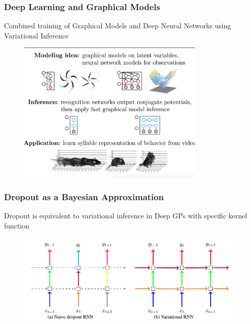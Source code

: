 \documentclass[11pt,
               hyperref={colorlinks,citecolor=pink,linkcolor=red,urlcolor=blue}
               ]{beamer}
\begin{document}
  \begin{frame}
    \frametitle{Deep Learning and Graphical Models}

    \centering Combined training of Graphical Models and Deep Neural Networks using Variational Inference\footnotemark[1]

    \begin{figure}
      \centering
      \includegraphics[width=0.8\textwidth]{bnn2.png}
    \end{figure}

  \end{frame}

  \begin{frame}
    \frametitle{Dropout as a Bayesian Approximation}

    \centering Dropout is equivalent to variational inference in Deep GPs with specific kernel function

    \begin{figure}
      \centering
      \includegraphics[width=\textwidth]{bnn4.png}
    \end{figure}

  \end{frame}
\end{document}
